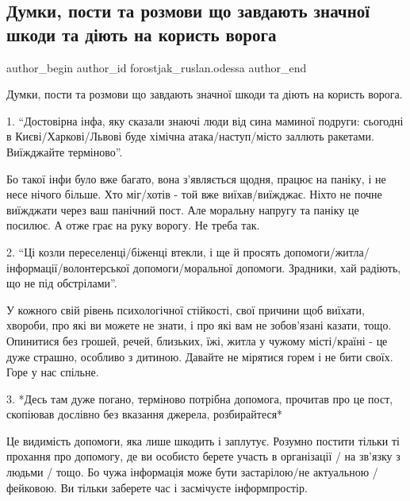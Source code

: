  
 
 
 
 
 
\subsection{Думки, пости та розмови що завдають значної шкоди та діють на користь ворога}
\label{sec:05_03_2022.fb.forostjak_ruslan.odessa.1.dumky}
 
\ifcmt
 author_begin
   author_id forostjak_ruslan.odessa
 author_end
\fi

Думки, пости та розмови що завдають значної шкоди та діють на користь ворога.

1. \enquote{Достовірна інфа, яку сказали знаючі люди від сина маминої подруги: сьогодні
в Києві/Харкові/Львові буде хімічна атака/наступ/місто заллють ракетами.
Виїжджайте терміново}. 

Бо такої інфи було вже багато, вона з'являється щодня, працює на паніку, і не
несе нічого більше. Хто міг/хотів - той вже виїхав/виїжджає. Ніхто не почне
виїжджати через ваш панічний пост. Але моральну напругу та паніку це посилює. А
отже грає на руку ворогу. Не треба так. 

2. \enquote{Ці козли переселенці/біженці втекли, і ще й просять
допомоги/житла/інформації/волонтерської допомоги/моральної допомоги. Зрадники,
хай радіють, що не під обстрілами}. 

У кожного свій рівень психологічної стійкості, свої причини щоб виїхати,
хвороби, про які ви можете не знати, і про які вам не зобов'язані казати, тощо.
Опинитися без грошей, речей, близьких, їжі, житла у чужому місті/країні - це
дуже страшно, особливо з дитиною. Давайте не мірятися горем і не бити своїх.
Горе у нас спільне. 

3. *Десь там дуже погано, терміново потрібна допомога, прочитав про це пост,
скопіював дослівно без вказання джерела, розбирайтеся* 

Це видимість допомоги, яка лише шкодить і заплутує. Розумно постити тільки ті
прохання про допомогу, де ви особисто берете участь в організації / на зв'язку
з людьми / тощо. Бо чужа інформація може бути застарілою/не актуальною /
фейковою. Ви тільки заберете час і засмічуєте інформпростір. 

